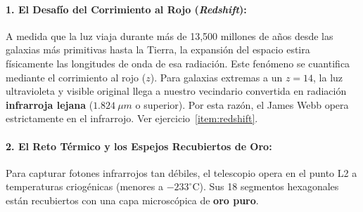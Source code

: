 \documentclass[11pt,a4paper]{book}
\begin{document}
\paragraph{1. El Desafío del Corrimiento al Rojo (\textit{Redshift}):}
A medida que la luz viaja durante más de 13,500 millones de años desde las galaxias más primitivas hasta la Tierra, la expansión del espacio estira físicamente las longitudes de onda de esa radiación. Este fenómeno se cuantifica mediante el corrimiento al rojo ($z$). Para galaxias extremas a un $z = 14$, la luz ultravioleta y visible original llega a nuestro vecindario convertida en radiación \textbf{infrarroja lejana} ($\qty{1.824}{\mu m}$ o superior). Por esta razón, el James Webb opera estrictamente en el infrarrojo. Ver ejercicio~\ref{item:redshift}.

\paragraph{2. El Reto Térmico y los Espejos Recubiertos de Oro:}
Para capturar fotones infrarrojos tan débiles, el telescopio opera en el punto L2 a temperaturas criogénicas (menores a $-233^\circ\text{C}$). Sus 18 segmentos hexagonales están recubiertos con una capa microscópica de \textbf{oro puro}. 
\end{document}
